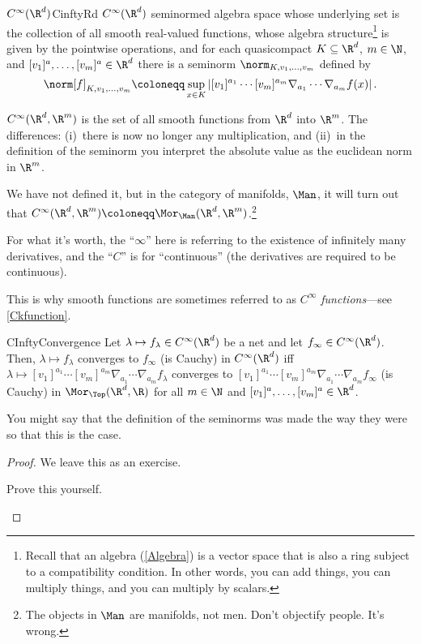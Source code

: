 \begin{dfn}{$C^\infty (\R ^d)$}{CinftyRd}
$C^\infty (\R ^d)$ seminormed algebra space whose underlying set is the collection of all smooth real-valued functions, whose algebra structure\footnote{Recall that an algebra (\cref{Algebra}) is a vector space that is also a ring subject to a compatibility condition.  In other words, you can add things, you can multiply things, and you can multiply by scalars.} is given by the pointwise operations, and for each quasicompact $K\subseteq \R ^d$, $m\in \N$, and $[v_1]^a,\ldots ,[v_m]^a\in \R ^d$ there is a seminorm $\norm_{K,v_1,\ldots ,v_m}$ defined by
\begin{equation}
\norm[f]_{K,v_1,\ldots ,v_m}\coloneqq \sup _{x\in K}\left| [v_1]^{a_1}\cdots [v_m]^{a_m}\nabla _{a_1}\cdots \nabla _{a_m}f(x)\right| .
\end{equation}
\begin{rmk}
$C ^{\infty}(\R ^d,\R ^m)$ is the set of all smooth functions from $\R ^d$ into $\R ^m$.  The differences:  (i)~there is now no longer any multiplication, and (ii)~in the definition of the seminorm you interpret the absolute value as the euclidean norm in $\R ^m$.
\end{rmk}
\begin{rmk}
We have not defined it, but in the category of manifolds, $\Man$, it will turn out that $C^\infty (\R ^d,\R ^m)\coloneqq \Mor _{\Man}(\R ^d,\R ^m)$.\footnote{The objects in $\Man$ are manifolds, not men.  Don't objectify people.  It's wrong.}
\end{rmk}
\begin{rmk}
For what it's worth, the ``$\infty$'' here is referring to the existence of infinitely many derivatives, and the ``$C$'' is for ``continuous'' (the derivatives are required to be continuous).
\end{rmk}
\begin{rmk}
This is why smooth functions are sometimes referred to as \emph{$C^{\infty}$ functions}---see \cref{Ckfunction}.
\end{rmk}
\end{dfn}
\begin{prp}{}{CInftyConvergence}
Let $\lambda \mapsto f_\lambda \in C^{\infty}(\R ^d)$ be a net and let $f_\infty \in C^{\infty}(\R ^d)$.  Then, $\lambda \mapsto f_\lambda$ converges to $f_\infty$ (is Cauchy) in $C^{\infty}(\R ^d)$ iff $\lambda \mapsto [v_1]^{a_1}\cdots [v_m]^{a_m}\nabla _{a_1}\cdots \nabla _{a_m}f_\lambda$ converges to $[v_1]^{a_1}\cdots [v_m]^{a_m}\nabla _{a_1}\cdots \nabla _{a_m}f_\infty$ (is Cauchy) in $\Mor _{
\Top}(\R ^d,\R )$ for all $m\in \N$ and $[v_1]^a,\ldots ,[v_m]^a\in \R ^d$.
\begin{rmk}
You might say that the definition of the seminorms was made the way they were so that this is the case.
\end{rmk}
\begin{proof}
We leave this as an exercise.
\begin{exr}[breakable=false]{}{}
Prove this yourself.
\end{exr}
\end{proof}
\end{prp}
